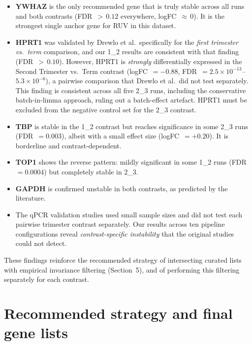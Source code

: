 \documentclass[11pt,a4paper]{article}
\begin{document}
\begin{itemize}
  \item \textbf{YWHAZ} is the only recommended gene that is truly
        stable across all runs and both contrasts (FDR~${>}\,0.12$
        everywhere, logFC~${\approx}\,0$).  It is the strongest single
        anchor gene for RUV in this dataset.

  \item \textbf{HPRT1} was validated by Drewlo et al.\ specifically
        for the \emph{first trimester vs.\ term} comparison, and our
        1\_2 results are consistent with that finding
        (FDR~${>}\,0.10$).  However, HPRT1 is \emph{strongly}
        differentially expressed in the Second Trimester vs.\ Term
        contrast (logFC~$= -0.88$,
        FDR~$= 2.5 \times 10^{-13}$--$5.3 \times 10^{-6}$), a
        pairwise comparison that Drewlo et al.\ did not test
        separately.  This finding is consistent across all five 2\_3
        runs, including the conservative batch-in-limma approach,
        ruling out a batch-effect artefact.  HPRT1 must be excluded
        from the negative control set for the 2\_3 contrast.

  \item \textbf{TBP} is stable in the 1\_2 contrast but reaches
        significance in some 2\_3 runs (FDR~$= 0.003$), albeit with a
        small effect size (logFC~$= +0.20$).  It is borderline and
        contrast-dependent.

  \item \textbf{TOP1} shows the reverse pattern: mildly significant in
        some 1\_2 runs (FDR~$= 0.0004$) but completely stable in 2\_3.

  \item \textbf{GAPDH} is confirmed unstable in both contrasts, as
        predicted by the literature.

  \item The qPCR validation studies used small sample sizes and did not
        test each pairwise trimester contrast separately.  Our results
        across ten pipeline configurations reveal
        \emph{contrast-specific instability} that the original studies
        could not detect.
\end{itemize}

These findings reinforce the recommended strategy of intersecting
curated lists with empirical invariance filtering (Section~5),
and of performing this filtering separately for each contrast.


\section{Recommended strategy and final gene lists}
\end{document}
